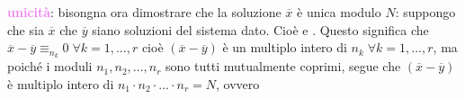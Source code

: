 \begin{flushleft}
\begin{boxA}
        \textcolor{violet}{\textbf{unicità}}: bisongna ora dimostrare che la soluzione $\overline{x}$ è unica modulo $N$: suppongo che sia $\overline{x}$ che $\overline{y}$ siano soluzioni del sistema dato. Cioè  e . Questo significa che $\overline{x} - \overline{y} \equiv_{n_k} 0 \; \forall k = 1, ..., r$ cioè $(\overline{x} - \overline{y})$ è un multiplo intero di $n_k \; \forall k = 1, ..., r$, ma poiché i moduli $n_1, n_2, ..., n_r$ sono tutti mutualmente coprimi, segue che $(\overline{x} - \overline{y})$ è multiplo intero di $n_1 \cdot n_2 \cdot ... \cdot n_r = N$, ovvero 
    \end{boxA}
\end{flushleft}

